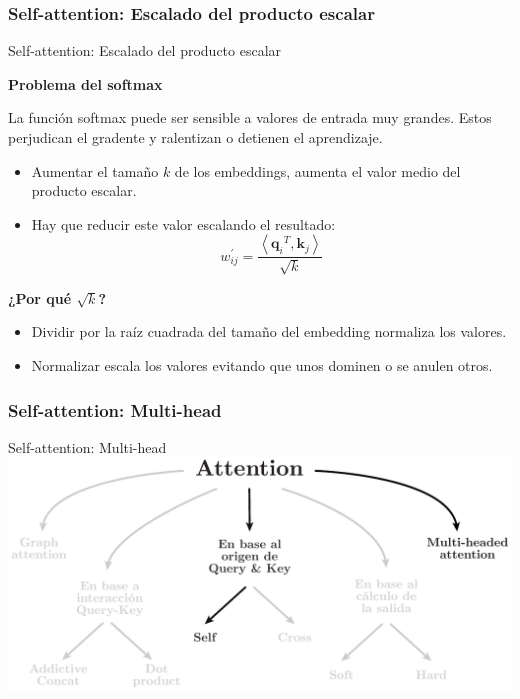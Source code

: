 \documentclass[aspectratio=169]{beamer}
\newenvironment{blockm}[1]{%
  \begin{block}{\textbf{#1}}%
  }{%
  \end{block}%
  \vspace{1em}%
}
\begin{document}
\subsubsection{Self-attention: Escalado del producto escalar }

\begin{frame}{Self-attention: Escalado del producto escalar }

  \begin{blockm}{Problema del softmax}
    La función softmax puede ser sensible a valores de entrada muy grandes. Estos perjudican el gradente y ralentizan o detienen el aprendizaje.
  \end{blockm}

  \begin{itemize}
    \item Aumentar el tamaño $k$ de los embeddings, aumenta el valor medio del producto escalar.
    \item Hay que reducir este valor escalando el resultado:
      \begin{equation*}
        w^{'}_{ij} = \frac{\left \langle {\mathbf{q}_{i}}^{T}, \mathbf{k}_{j} \right \rangle}{\sqrt{k}}
      \end{equation*}
  \end{itemize}

  \textbf{¿Por qué $\sqrt{k}$?}
  \begin{itemize}
    \item Dividir por la raíz cuadrada del tamaño del embedding normaliza los valores.
    \item Normalizar escala los valores evitando que unos dominen o se anulen otros.
  \end{itemize}

 \end{frame}

\subsubsection{Self-attention: Multi-head}

\begin{frame}{Self-attention: Multi-head }
  \includegraphics[width=.85\textwidth, center]{imgs/tema4/att/AttOutline multi.pdf}
\end{frame}
\end{document}
